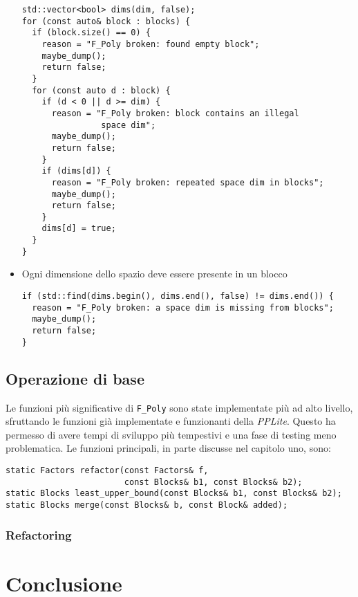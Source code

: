 \documentclass{mimosis}
\theoremstyle{definition}
\begin{document}
\begin{itemize}
\begin{verbatim}
std::vector<bool> dims(dim, false);
for (const auto& block : blocks) {
  if (block.size() == 0) {
    reason = "F_Poly broken: found empty block";
    maybe_dump();
    return false;
  }
  for (const auto d : block) {
    if (d < 0 || d >= dim) {
      reason = "F_Poly broken: block contains an illegal
                space dim";
      maybe_dump();
      return false;
    }
    if (dims[d]) {
      reason = "F_Poly broken: repeated space dim in blocks";
      maybe_dump();
      return false;
    }
    dims[d] = true;
  }
}
\end{verbatim}
\item Ogni dimensione dello spazio deve essere presente in un blocco
\begin{verbatim}
if (std::find(dims.begin(), dims.end(), false) != dims.end()) {
  reason = "F_Poly broken: a space dim is missing from blocks";
  maybe_dump();
  return false;
}
\end{verbatim}
\end{itemize}

\section{Operazione di base}
\label{sec:orga595378}
Le funzioni più significative di \texttt{F\_Poly} sono state implementate più ad alto
livello, sfruttando le funzioni già implementate e funzionanti della \emph{PPLite}.
Questo ha permesso di avere tempi di sviluppo più tempestivi e una fase di
testing meno problematica. Le funzioni principali, in parte discusse nel
capitolo uno, sono:

\begin{verbatim}
static Factors refactor(const Factors& f,
                        const Blocks& b1, const Blocks& b2);
static Blocks least_upper_bound(const Blocks& b1, const Blocks& b2);
static Blocks merge(const Blocks& b, const Block& added);
\end{verbatim}

\subsection{Refactoring}
\label{sec:org51befd7}


\chapter{Conclusione}
\label{sec:org752ba44}
\end{document}
